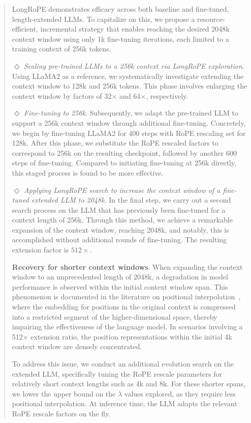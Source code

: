 \begin{abstract}
LongRoPE demonstrates efficacy across both baseline and fine-tuned, length-extended LLMs. To capitalize on this, we propose a resource-efficient, incremental strategy that enables reaching the desired 2048k context window using only 1k fine-tuning iterations, each limited to a training context of 256k tokens.

$\Diamond$ \textit{Scaling pre-trained LLMs to a 256k context via LongRoPE exploration}. Using LLaMA2 as a reference, we systematically investigate extending the context window to 128k and 256k tokens. This phase involves enlarging the context window by factors of 32$\times$ and 64$\times$, respectively.

$\Diamond$ \textit{Fine-tuning to 256k}. Subsequently, we adapt the pre-trained LLM to support a 256k context window through additional fine-tuning. Concretely, we begin by fine-tuning LLaMA2 for 400 steps with RoPE rescaling set for 128k. After this phase, we substitute the RoPE rescaled factors to correspond to 256k on the resulting checkpoint, followed by another 600 steps of fine-tuning. Compared to initiating fine-tuning at 256k directly, this staged process is found to be more effective.

$\Diamond$ \textit{Applying LongRoPE search to increase the context window of a fine-tuned extended LLM to 2048k}. In the final step, we carry out a second search process on the LLM that has previously been fine-tuned for a context length of 256k. Through this method, we achieve a remarkable expansion of the context window, reaching 2048k, and notably, this is accomplished without additional rounds of fine-tuning. The resulting extension factor is $512\times$.

\textbf{Recovery for shorter context windows}.  When expanding the context window to an unprecedented length of 2048k, a degradation in model performance is observed within the initial context window span. This phenomenon is documented in the literature on positional interpolation~\cite{pi}, where the embedding for positions in the original context is compressed into a restricted segment of the higher-dimensional space, thereby impairing the effectiveness of the language model. In scenarios involving a 512$\times$ extension ratio, the position representations within the initial 4k context window are densely concentrated.

To address this issue, we conduct an additional evolution search on the extended LLM, specifically tuning the RoPE rescale parameters for relatively short context lengths such as 4k and 8k. For these shorter spans, we lower the upper bound on the $\lambda$ values explored, as they require less positional interpolation. At inference time, the LLM adapts the relevant RoPE rescale factors on the fly.


\end{abstract}
